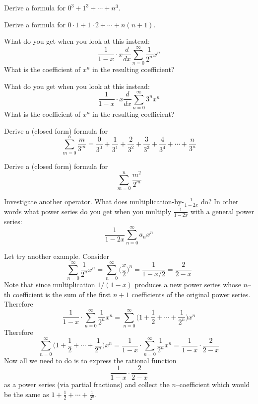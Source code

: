 \newpage
\begin{ex}
Derive a formula for $0^3 + 1^3 + \cdots + n^3$.
\end{ex}



\newpage
\begin{ex}
Derive a formula for $0 \cdot 1 + 1 \cdot 2 + \cdots + n(n+1)$.
\end{ex}


\newpage
\begin{ex}
What do you get when you look at this instead:
\[
\frac{1}{1-x} \cdot x \frac{d}{dx} \sum_{n=0}^\infty \frac{1}{2^n}x^n
\]
What is the coefficient of $x^n$ in the resulting coefficient?
\end{ex}


\newpage
\begin{ex}
What do you get when you look at this instead:
\[
\frac{1}{1-x} \cdot x \frac{d}{dx} \sum_{n=0}^\infty 3^n x^n
\]
What is the coefficient of $x^n$ in the resulting coefficient?
\end{ex}


\newpage
\begin{ex}
Derive a (closed form) formula for 
\[
\sum_{m=0}^n \frac{m}{3^m} = \frac{0}{3^0} + \frac{1}{3^1} + \frac{2}{3^2} + \frac{3}{3^3} + \frac{4}{3^4} + \cdots + \frac{n}{3^n}
\]
\end{ex}



\newpage
\begin{ex}
Derive a (closed form) formula for 
\[
\sum_{m=0}^n \frac{m^2}{2^m}
\]
\end{ex}


\newpage
\begin{ex}
Investigate another operator. What does multiplication-by-$\frac{1}{1-2x}$
do?
In other words what power series do you get when you multiply 
$\frac{1}{1-2x}$ with a general power series:
\[
\frac{1}{1 - 2x} \sum_{n=0}^\infty a_n x^n
\]
\end{ex}


\newpage
Let try another example.
Consider
\[
\sum_{n=0}^\infty \frac{1}{2^n} x^n 
= 
\sum_{n=0}^\infty \biggl( \frac{x}{2} \biggr) ^n
=
\frac{1}{1 - x/2}
= 
\frac{2}{2 - x} 
\]
Note that since multiplication $1/(1-x)$ produces a new power series
whose $n$--th coefficient is the sum of the first $n+1$ coefficients of
the original power series.
Therefore
\[
\frac{1}{1-x} \cdot \sum_{n=0}^\infty \frac{1}{2^n} x^n 
= 
\sum_{n=0}^\infty \biggl( 1 + \frac{1}{2} + \cdots + \frac{1}{2^n} \biggr) x^n
\]
Therefore
\[
\sum_{n=0}^\infty \biggl( 1 + \frac{1}{2} + \cdots + \frac{1}{2^n} \biggr) x^n
=
\frac{1}{1-x} \cdot \sum_{n=0}^\infty \frac{1}{2^n} x^n 
=
\frac{1}{1 - x} \cdot
\frac{2}{2 - x} 
\]
Now all we need to do is to express the rational function
\[
\frac{1}{1 - x} \cdot
\frac{2}{2 - x} 
\]
as a power series (via partial fractions) and collect the $n$--coefficient
which would be the same as 
$1 + \frac{1}{2} + \cdots + \frac{1}{2^n}$.

